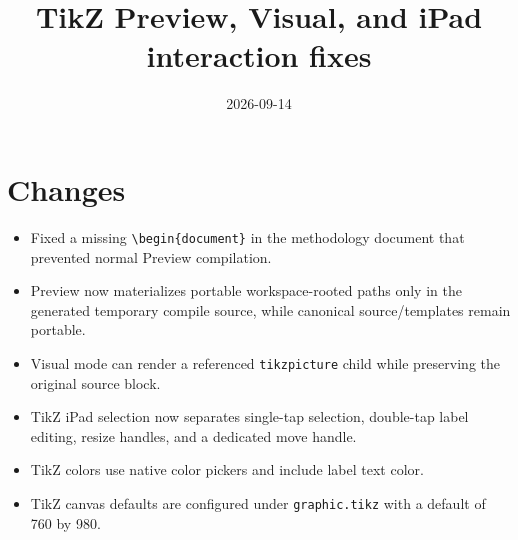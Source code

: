 \documentclass[a4paper]{article}
\title{TikZ Preview, Visual, and iPad interaction fixes}
\date{2026-09-14}
\author{}
\begin{document}
\maketitle

\section*{Changes}
\begin{itemize}
   \item Fixed a missing \verb|\begin{document}| in the methodology document that prevented normal Preview compilation.
   \item Preview now materializes portable workspace-rooted paths only in the generated temporary compile source, while canonical source/templates remain portable.
   \item Visual mode can render a referenced \verb|tikzpicture| child while preserving the original \verb|| source block.
   \item TikZ iPad selection now separates single-tap selection, double-tap label editing, resize handles, and a dedicated move handle.
   \item TikZ colors use native color pickers and include label text color.
   \item TikZ canvas defaults are configured under \verb|graphic.tikz| with a default of 760 by 980.
\end{itemize}
\end{document}
